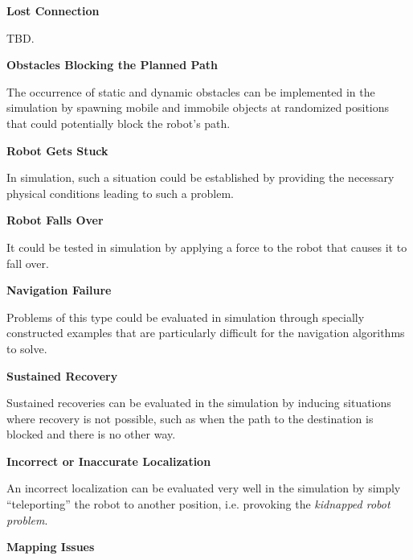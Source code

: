 \documentclass[english, master, utf8]{base/thesis_KBS}
\begin{document}
\noindent
\textbf{Lost Connection}\newline

\noindent
TBD.\newline

\noindent
\textbf{Obstacles Blocking the Planned Path}\newline

\noindent
The occurrence of static and dynamic obstacles can be implemented in the simulation by spawning mobile and immobile objects at randomized 
positions that could potentially block the robot's path.\newline

\noindent
\textbf{Robot Gets Stuck}\newline

\noindent
In simulation, such a situation could be established by providing the necessary physical conditions leading to such a problem.\newline

\noindent
\textbf{Robot Falls Over}\newline

\noindent
It could be tested in simulation by applying a force to the robot that causes it to fall over.\newline

\noindent
\textbf{Navigation Failure}\newline

\noindent
Problems of this type could be evaluated in simulation through specially constructed examples that are particularly difficult for the navigation algorithms to solve.\newline

\noindent
\textbf{Sustained Recovery}\newline

\noindent
Sustained recoveries can be evaluated in the simulation by inducing situations where recovery is not possible, such as when the path to the destination is
blocked and there is no other way.\newline

\noindent
\textbf{Incorrect or Inaccurate Localization}\newline

\noindent
An incorrect localization can be evaluated very well in the simulation by simply ``teleporting'' the robot to another position, i.e. provoking the
\textit{kidnapped robot problem}.\newline

\noindent
\textbf{Mapping Issues}\newline
\end{document}
